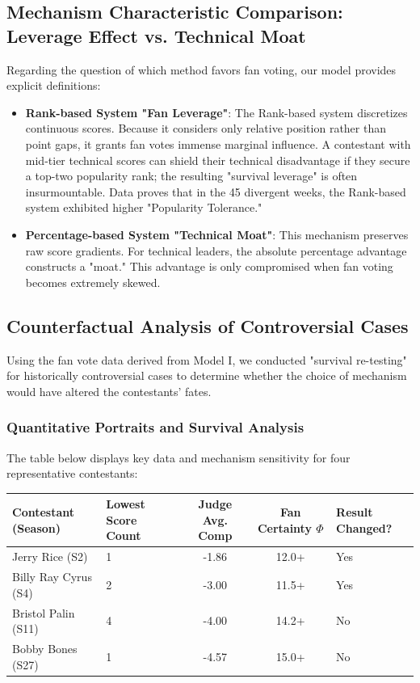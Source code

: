 \documentclass[12pt]{article}
\begin{document}
	\subsection{Mechanism Characteristic Comparison: Leverage Effect vs. Technical Moat}
	Regarding the question of which method favors fan voting, our model provides explicit definitions:
	\begin{itemize}
		\item \textbf{Rank-based System "Fan Leverage"}: The Rank-based system discretizes continuous scores. Because it considers only relative position rather than point gaps, it grants fan votes immense marginal influence. A contestant with mid-tier technical scores can shield their technical disadvantage if they secure a top-two popularity rank; the resulting "survival leverage" is often insurmountable. Data proves that in the 45 divergent weeks, the Rank-based system exhibited higher "Popularity Tolerance."
		\item \textbf{Percentage-based System "Technical Moat"}: This mechanism preserves raw score gradients. For technical leaders, the absolute percentage advantage constructs a "moat." This advantage is only compromised when fan voting becomes extremely skewed.
	\end{itemize}
	
	\subsection{Counterfactual Analysis of Controversial Cases}
	Using the fan vote data derived from Model I, we conducted "survival re-testing" for historically controversial cases to determine whether the choice of mechanism would have altered the contestants' fates.
	
	\subsubsection{Quantitative Portraits and Survival Analysis}
	The table below displays key data and mechanism sensitivity for four representative contestants:
	\begin{table}[htbp]
		\centering
		\small
		\begin{tabularx}{\linewidth}{lXccX}
			\toprule
			Contestant (Season) & Lowest Score Count & Judge Avg. Comp & Fan Certainty $\Phi$ & Result Changed? \\
			\midrule
			Jerry Rice (S2) & 1 & -1.86 & 12.0+ & Yes \\
			Billy Ray Cyrus (S4) & 2 & -3.00 & 11.5+ & Yes \\
			Bristol Palin (S11) & 4 & -4.00 & 14.2+ & No \\
			Bobby Bones (S27) & 1 & -4.57 & 15.0+ & No \\
			\bottomrule
		\end{tabularx}
	\end{table}
	
\end{document}
